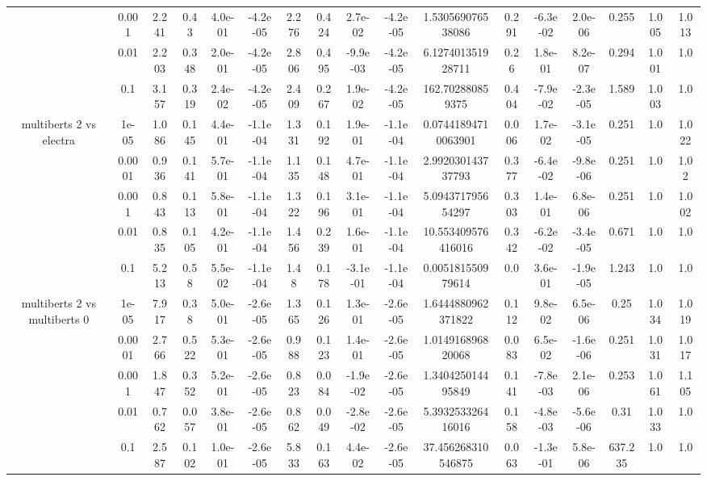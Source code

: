 \begin{tabular}{|c|c|c|c|c|c|c|c|c|c|c|c|c|c|c|c|c|}
 & 0.001 & 2.241 & 0.43 & 4.0e-01 & -4.2e-05 & 2.276 & 0.424 & 2.7e-02 & -4.2e-05 & 1.530569076538086 & 0.291 & -6.3e-02 & 2.0e-06 & 0.255 & 1.005 & 1.013 \\
 & 0.01 & 2.203 & 0.348 & 2.0e-01 & -4.2e-05 & 2.806 & 0.495 & -9.9e-03 & -4.2e-05 & 6.127401351928711 & 0.26 & 1.8e-01 & 8.2e-07 & 0.294 & 1.001 & 1.0 \\
 & 0.1 & 3.157 & 0.319 & 2.4e-02 & -4.2e-05 & 2.409 & 0.267 & 1.9e-02 & -4.2e-05 & 162.702880859375 & 0.404 & -7.9e-02 & -2.3e-05 & 1.589 & 1.003 & 1.0 \\
\hline
\multirow{5}{*}{multiberts 2 vs electra } & 1e-05 & 1.086 & 0.145 & 4.4e-01 & -1.1e-04 & 1.331 & 0.192 & 1.9e-01 & -1.1e-04 & 0.07441894710063901 & 0.006 & 1.7e-02 & -3.1e-05 & 0.251 & 1.0 & 1.022 \\
 & 0.0001 & 0.936 & 0.141 & 5.7e-01 & -1.1e-04 & 1.135 & 0.148 & 4.7e-01 & -1.1e-04 & 2.992030143737793 & 0.377 & -6.4e-02 & -9.8e-06 & 0.251 & 1.0 & 1.02 \\
 & 0.001 & 0.843 & 0.113 & 5.8e-01 & -1.1e-04 & 1.322 & 0.196 & 3.1e-01 & -1.1e-04 & 5.094371795654297 & 0.303 & 1.4e-01 & 6.8e-06 & 0.251 & 1.0 & 1.002 \\
 & 0.01 & 0.835 & 0.105 & 4.2e-01 & -1.1e-04 & 1.456 & 0.239 & 1.6e-01 & -1.1e-04 & 10.553409576416016 & 0.342 & -6.2e-02 & -3.4e-05 & 0.671 & 1.0 & 1.0 \\
 & 0.1 & 5.213 & 0.58 & 5.5e-02 & -1.1e-04 & 1.48 & 0.178 & -3.1e-01 & -1.1e-04 & 0.005181550979614 & 0.0 & 3.6e-01 & -1.9e-05 & 1.243 & 1.0 & 1.0 \\
\hline
\multirow{5}{*}{multiberts 2 vs multiberts 0} & 1e-05 & 7.917 & 0.38 & 5.0e-01 & -2.6e-05 & 1.365 & 0.126 & 1.3e-01 & -2.6e-05 & 1.6444880962371822 & 0.112 & 9.8e-02 & 6.5e-06 & 0.25 & 1.034 & 1.019 \\
 & 0.0001 & 2.766 & 0.522 & 5.3e-01 & -2.6e-05 & 0.988 & 0.123 & 1.4e-01 & -2.6e-05 & 1.014916896820068 & 0.083 & 6.5e-02 & -1.6e-06 & 0.251 & 1.031 & 1.017 \\
 & 0.001 & 1.847 & 0.352 & 5.2e-01 & -2.6e-05 & 0.823 & 0.084 & -1.9e-02 & -2.6e-05 & 1.340425014495849 & 0.141 & -7.8e-03 & 2.1e-06 & 0.253 & 1.061 & 1.105 \\
 & 0.01 & 0.762 & 0.057 & 3.8e-01 & -2.6e-05 & 0.862 & 0.049 & -2.8e-02 & -2.6e-05 & 5.393253326416016 & 0.158 & -4.8e-03 & -5.6e-06 & 0.31 & 1.033 & 1.0 \\
 & 0.1 & 2.587 & 0.102 & 1.0e-01 & -2.6e-05 & 5.833 & 0.163 & 4.4e-02 & -2.6e-05 & 37.456268310546875 & 0.063 & -1.3e-01 & 5.8e-06 & 637.235 & 1.0 & 1.0 \\

\end{tabular}
